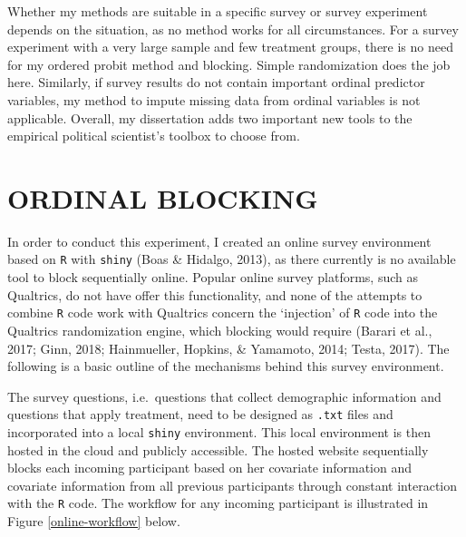 \documentclass[12pt,econ]{sources/authesis}
\begin{document}
Whether my methods are suitable in a specific survey or survey experiment depends on the situation, as no method works for all circumstances. For a survey experiment with a very large sample and few treatment groups, there is no need for my ordered probit method and blocking. Simple randomization does the job here. Similarly, if survey results do not contain important ordinal predictor variables, my method to impute missing data from ordinal variables is not applicable. Overall, my dissertation adds two important new tools to the empirical political scientist's toolbox to choose from.

\appendix

\hypertarget{app-ordblock}{%
\chapter{ORDINAL BLOCKING}\label{app-ordblock}}

In order to conduct this experiment, I created an online survey environment based on \texttt{R} with \texttt{shiny} (Boas \& Hidalgo, 2013), as there currently is no available tool to block sequentially online. Popular online survey platforms, such as Qualtrics, do not have offer this functionality, and none of the attempts to combine \texttt{R} code work with Qualtrics concern the `injection' of \texttt{R} code into the Qualtrics randomization engine, which blocking would require (Barari et al., 2017; Ginn, 2018; Hainmueller, Hopkins, \& Yamamoto, 2014; Testa, 2017). The following is a basic outline of the mechanisms behind this survey environment.

The survey questions, i.e.~questions that collect demographic information and questions that apply treatment, need to be designed as \texttt{.txt} files and incorporated into a local \texttt{shiny} environment. This local environment is then hosted in the cloud and publicly accessible. The hosted website sequentially blocks each incoming participant based on her covariate information and covariate information from all previous participants through constant interaction with the \texttt{R} code. The workflow for any incoming participant is illustrated in Figure \ref{online-workflow} below.
\end{document}
